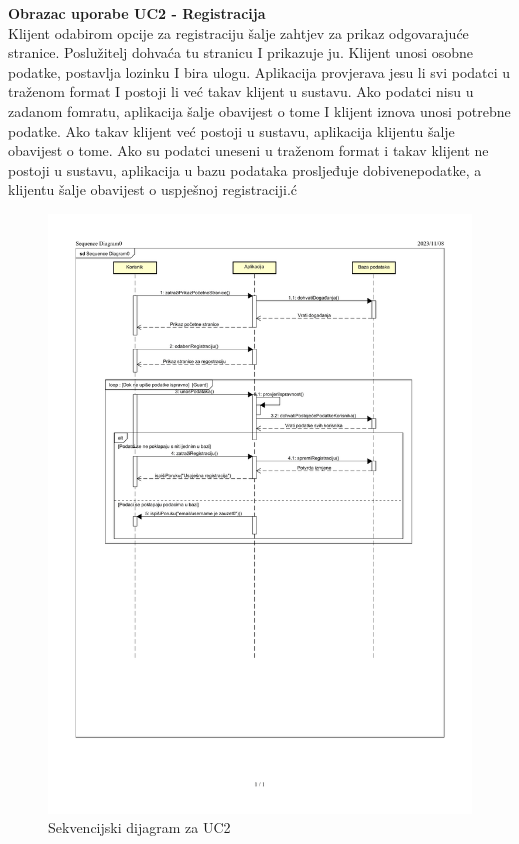 				
				\textbf{\large Obrazac uporabe UC2 - Registracija}\\
				
				
				Klijent odabirom opcije za registraciju šalje zahtjev za prikaz odgovarajuće stranice. Poslužitelj dohvaća tu stranicu I prikazuje ju. Klijent unosi osobne podatke, postavlja lozinku I bira ulogu. Aplikacija provjerava jesu li svi podatci u traženom format I postoji li već takav klijent u sustavu. Ako podatci nisu u zadanom fomratu, aplikacija šalje obavijest o tome I klijent iznova unosi potrebne podatke. Ako takav klijent već postoji u sustavu, aplikacija klijentu šalje obavijest o tome. Ako su podatci uneseni u traženom format i takav klijent ne postoji u sustavu, aplikacija u bazu podataka prosljeđuje dobivenepodatke, a klijentu šalje obavijest o uspješnoj registraciji.ć
				\begin{figure}[H]
						\includegraphics[scale=0.7]{slike/sek_dijagram1-1.PNG} %
						\centering
						\caption{Sekvencijski dijagram za UC2}
						\label{fig:promjene}
				\end{figure}
				
